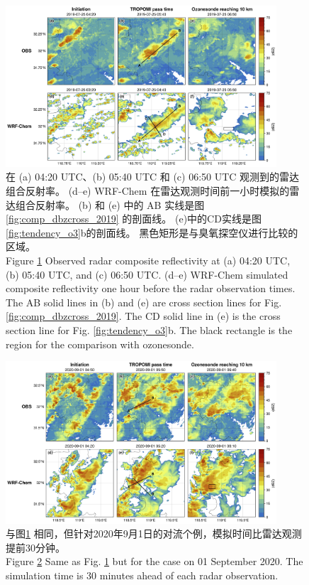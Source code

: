 \begin{figure}[htbp]
\centering
\includegraphics[width=0.9\textwidth]{./figures/comp_crf_2019.png}
\caption{在 (a) 04:20 UTC、(b) 05:40 UTC 和 (c) 06:50 UTC 观测到的雷达组合反射率。
         (d--e) WRF-Chem 在雷达观测时间前一小时模拟的雷达组合反射率。
         (b) 和 (e) 中的 AB 实线是图 \ref{fig:comp_dbzcross_2019} 的剖面线。
         (e)中的CD实线是图\ref{fig:tendency_o3}b的剖面线。
         黑色矩形是与臭氧探空仪进行比较的区域。\\
Figure \ref{fig:comp_crf_2019} Observed radar composite reflectivity at (a) 04:20 UTC, (b) 05:40 UTC, and (c) 06:50 UTC.
        (d--e) WRF-Chem simulated composite reflectivity one hour before the radar observation times.
        The AB solid lines in (b) and (e) are cross section lines for Fig. \ref{fig:comp_dbzcross_2019}.
        The CD solid line in (e) is the cross section line for Fig. \ref{fig:tendency_o3}b.
        The black rectangle is the region for the comparison with ozonesonde.}
\label{fig:comp_crf_2019}
\end{figure}

\begin{figure}[htbp]
\centering
\includegraphics[width=0.9\textwidth]{./figures/comp_crf_2020.png}
\caption{与图\ref{fig:comp_crf_2019} 相同，但针对2020年9月1日的对流个例，模拟时间比雷达观测提前30分钟。\\
Figure \ref{fig:comp_crf_2020} Same as Fig. \ref{fig:comp_crf_2019} but for the case on 01 September 2020.
The simulation time is 30 minutes ahead of each radar observation.}
\label{fig:comp_crf_2020}
\end{figure}

